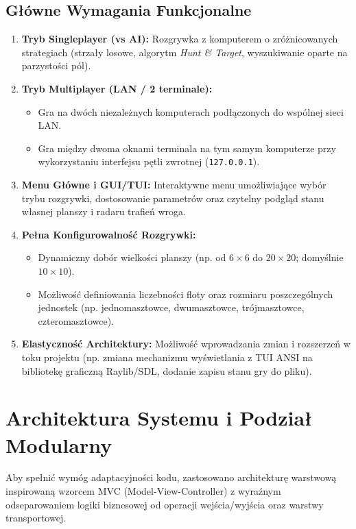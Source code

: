 \documentclass[11pt,a4paper]{article}
\begin{document}
\subsection{Główne Wymagania Funkcjonalne}
\begin{enumerate}[noitemsep]
    \item \textbf{Tryb Singleplayer (vs AI):} Rozgrywka z komputerem o zróżnicowanych strategiach (strzały losowe, algorytm \textit{Hunt \& Target}, wyszukiwanie oparte na parzystości pól).
    \item \textbf{Tryb Multiplayer (LAN / 2 terminale):}
    \begin{itemize}[noitemsep]
        \item Gra na dwóch niezależnych komputerach podłączonych do wspólnej sieci LAN.
        \item Gra między dwoma oknami terminala na tym samym komputerze przy wykorzystaniu interfejsu pętli zwrotnej (\texttt{127.0.0.1}).
    \end{itemize}
    \item \textbf{Menu Główne i GUI/TUI:} Interaktywne menu umożliwiające wybór trybu rozgrywki, dostosowanie parametrów oraz czytelny podgląd stanu własnej planszy i radaru trafień wroga.
    \item \textbf{Pełna Konfigurowalność Rozgrywki:}
    \begin{itemize}[noitemsep]
        \item Dynamiczny dobór wielkości planszy (np. od $6\times6$ do $20\times20$; domyślnie $10\times10$).
        \item Możliwość definiowania liczebności floty oraz rozmiaru poszczególnych jednostek (np. jednomasztowce, dwumasztowce, trójmasztowce, czteromasztowce).
    \end{itemize}
    \item \textbf{Elastyczność Architektury:} Możliwość wprowadzania zmian i rozszerzeń w toku projektu (np. zmiana mechanizmu wyświetlania z TUI ANSI na bibliotekę graficzną Raylib/SDL, dodanie zapisu stanu gry do pliku).
\end{enumerate}

\section{Architektura Systemu i Podział Modularny}
Aby spełnić wymóg adaptacyjności kodu, zastosowano architekturę warstwową inspirowaną wzorcem MVC (Model-View-Controller) z wyraźnym odseparowaniem logiki biznesowej od operacji wejścia/wyjścia oraz warstwy transportowej.
\end{document}
